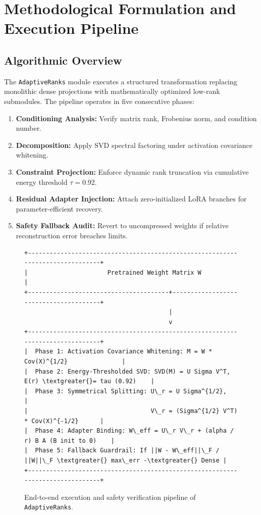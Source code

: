 \section{Methodological Formulation and Execution Pipeline}

\subsection{Algorithmic Overview}
The \texttt{AdaptiveRanks} module executes a structured transformation replacing monolithic dense projections with mathematically optimized low-rank submodules. The pipeline operates in five consecutive phases:
\begin{enumerate}
  \item \textbf{Conditioning Analysis:} Verify matrix rank, Frobenius norm, and condition number.
  \item \textbf{Decomposition:} Apply SVD spectral factoring under activation covariance whitening.
  \item \textbf{Constraint Projection:} Enforce dynamic rank truncation via cumulative energy threshold $\tau = 0.92$.
  \item \textbf{Residual Adapter Injection:} Attach zero-initialized LoRA branches for parameter-efficient recovery.
  \item \textbf{Safety Fallback Audit:} Revert to uncompressed weights if relative reconstruction error breaches limits.
\end{enumerate}

\begin{figure}[t]
\centering
\begin{verbatim}
+-------------------------------------------------------------------------------+
|                      Pretrained Weight Matrix W                               |
+---------------------------------------+---------------------------------------+
                                        |
                                        v
+-------------------------------------------------------------------------------+
|  Phase 1: Activation Covariance Whitening: M = W * Cov(X)^{1/2}               |
|  Phase 2: Energy-Thresholded SVD: SVD(M) = U Sigma V^T, E(r) \textgreater{}= tau (0.92)    |
|  Phase 3: Symmetrical Splitting: U\_r = U Sigma^{1/2},                         |
|                                  V\_r = (Sigma^{1/2} V^T) * Cov(X)^{-1/2}      |
|  Phase 4: Adapter Binding: W\_eff = U\_r V\_r + (alpha / r) B A (B init to 0)    |
|  Phase 5: Fallback Guardrail: If ||W - W\_eff||\_F / ||W||\_F \textgreater{} max\_err -\textgreater{} Dense |
+-------------------------------------------------------------------------------+
\end{verbatim}
\caption{End-to-end execution and safety verification pipeline of \texttt{AdaptiveRanks}.}
\end{figure}

